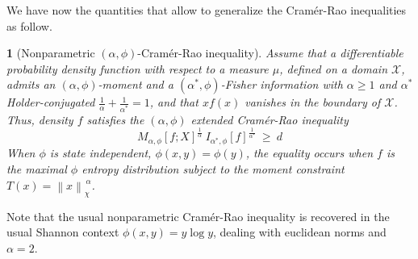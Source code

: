 \documentclass[english,sort&compress]{elsarticle}
\theoremstyle{definition}
\theoremstyle{plain}
\newtheorem{prop}{\protect\propositionname}
\theoremstyle{plain}
\providecommand{\propositionname}{Proposition}
\def\X{\mathcal{X}}
\begin{document}
We  have  now   the  quantities  that  allow  to   generalize  the  Cram\'er-Rao
inequalities as follow.
%
\begin{prop}[Nonparametric $(\alpha,\phi)$-Cram\'er-Rao inequality]\label{prop:np-phi-CR}
  Assume that  a differentiable probability  density function with respect  to a
  measure $\mu$, defined on a  domain $\X$, admits an $(\alpha,\phi)$-moment and
  a  $(\alpha^*,\phi)$-Fisher information  with  $\alpha \ge  1$ and  $\alpha^*$
  Holder-conjugated  $\frac{1}{\alpha} +  \frac{1}{\alpha^*} =  1$, and  that $x
  f(x)$  vanishes in  the boundary  of $\X$.   Thus, density  $f$  satisfies the
  $(\alpha,\phi)$ extended Cram\'er-Rao inequality
  \begin{equation}\label{eq:np-phi-CR}
   M_{\alpha,\phi}[f;X]^{\frac{1}{\alpha}} \: I_{\alpha^*\!,\phi}[f]^{\frac{1}{\alpha^*}}
   \: \ge \: d
  \end{equation}
  When $\phi$ is  state independent, $\phi(x,y) = \phi(y)$,  the equality occurs
  when  $f$ is the  maximal $\phi$  entropy distribution  subject to  the moment
  constraint $T(x) = \left\| x \right\|_{\chi}^{\, \alpha}$.
\end{prop}
%
Note that the usual nonparametric  Cram\'er-Rao inequality is recovered in the
usual Shannon context  $\phi(x,y) = y \log y$, dealing  with euclidean norms and
$\alpha = 2$.
\end{document}

